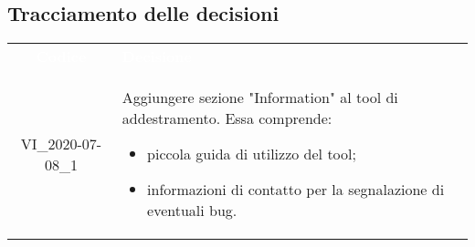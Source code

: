\subsection{Tracciamento delle decisioni}
\begin{longtable}{ c L{12cm} }
\textcolor{white}{\textbf{Codice}} & \centerline{\textcolor{white}{\textbf{Decisione}}}\\	
		VI\_2020-07-08\_1 & Aggiungere sezione "Information" al tool di addestramento. Essa comprende: \begin{itemize}
		\item piccola guida di utilizzo del tool;
		\item informazioni di contatto per la segnalazione di eventuali bug.
		\end{itemize}
\end{longtable}